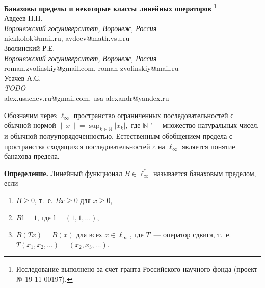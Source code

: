 \documentclass[a4paper,14pt]{article}
\begin{document}
\pagestyle{fancy}
\fancyhead{}
\fancyfoot{}
\fancyfoot[R]{\footnotesize{}}
\renewcommand{\footrulewidth}{0.1 mm}

\begin{center}
\textbf{Банаховы пределы и некоторые классы линейных операторов}%
\footnote{Исследование выполнено за счет гранта Российского научного фонда (проект № 19-11-00197).}\\
\vspace{\baselineskip}
Авдеев Н.Н.\\
\emph{Воронежский госуниверситет, Воронеж, Россия}\\nickkolok@mail.ru, avdeev@math.vsu.ru
\vspace{\baselineskip}\\
Зволинский Р.Е.\\
\emph{Воронежский госуниверситет, Воронеж, Россия}\\roman.zvolinskiy@gmail.com, roman-zvolinskiy@mail.ru
\vspace{\baselineskip}\\
Усачев А.С.\\
\emph{TODO}\\alex.usachev.ru@gmail.com, usa-alexandr@yandex.ru
\vspace{\baselineskip}\\
\end{center}
\vspace{\baselineskip}

\setcounter{equation}{0}
\setcounter{figure}{0}

Обозначим через $\ell_\infty$ пространство ограниченных последовательностей с обычной нормой
$
	\|x\| = \sup_{k\in\mathbb{N}} |x_k|
	,
$
где $\mathbb{N}$ "--- множество натуральных чисел, и обычной полуупорядоченностью.
Естественным обобщением предела с пространства сходящихся последовательностей $c$ на $\ell_\infty$
является понятие банахова предела.

\textbf{Определение.}
	Линейный функционал $B\in \ell_\infty^*$ называется банаховым пределом,
	если
	\begin{enumerate}
		\item
			$B\geq0$, т.~е. $Bx \geq 0$ для $x \geq 0$,
		\item
			$B\mathbb{I}=1$, где $\mathbb{I} =(1,1,\ldots)$,
		\item
			$B(Tx)=B(x)$ для всех $x\in \ell_\infty$, где $T$~---
			оператор сдвига, т.~е. $T(x_1,x_2,\ldots)=(x_2,x_3,\ldots)$.
	\end{enumerate}
\end{document}
